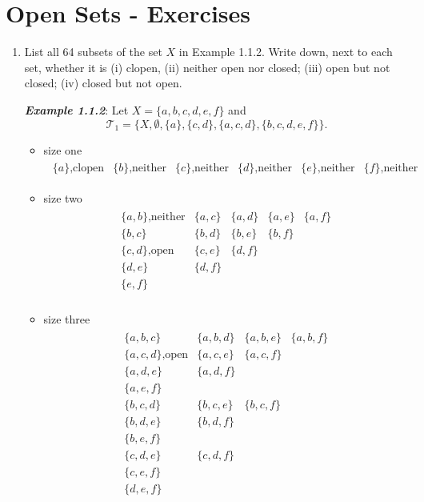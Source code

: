\documentclass[10pt,a4paper]{report}
\newcommand{\TT}{\mathcal{T}}
\begin{document}
\newpage
\section{Open Sets - Exercises}

\begin{enumerate}
\item List all 64 subsets of the set $X$ in Example 1.1.2.  Write down, next to each set, whether it is (i) clopen, (ii) neither open nor closed; (iii) open but not closed; (iv) closed but not open.

\newcommand{\OPEN}{\text{,open}}
\newcommand{\CLOSED}{\text{,closed}}
\newcommand{\CLOPEN}{\text{,clopen}}
\newcommand{\NOTT}{\text{,neither}}
\textbf{\textit{Example 1.1.2}}: Let $X=\{a,b,c,d,e,f\}$ and \[ \TT_1=\{X,\emptyset, \{a\}, \{c,d\},\{a,c,d\},\{b,c,d,e,f\}\}.\]
\begin{itemize}
	\item size one
	\begin{align*}
		\begin{array}{cccccc}
			\{a\}\CLOPEN&\{b\}\NOTT&\{c\}\NOTT&\{d\}\NOTT&\{e\}\NOTT&\{f\}\NOTT
		\end{array}
	\end{align*}
	
	\item size two
	\begin{align*}
		\begin{array}{ccccc}
			\{a,b\}\NOTT&\{a,c\}&\{a,d\}&\{a,e\}&\{a,f\}\\
			\{b,c\}&\{b,d\}&\{b,e\}&\{b,f\}\\
			\{c,d\}\OPEN&\{c,e\}&\{d,f\}\\
			\{d,e\}&\{d,f\}\\
			\{e,f\}\\
		\end{array}
	\end{align*}
	
	\item size three
	\begin{align*}
		\begin{array}{cccc}
			\{a,b,c\} & \{a,b,d\} & \{a,b,e\} & \{a,b,f\}\\
			\{a,c,d\}\OPEN & \{a,c,e\} & \{a,c,f\}\\
			\{a,d,e\} & \{a,d,f\}\\
			\{a,e,f\}\\
			\{b,c,d\} & \{b,c,e\} & \{b,c,f\}\\
			\{b,d,e\} & \{b,d,f\}\\
			\{b,e,f\}\\
			\{c,d,e\} & \{c,d,f\}\\
			\{c,e,f\}\\
			\{d,e,f\}
		\end{array}
	\end{align*}
	

\end{itemize}
\end{enumerate}
\end{document}
